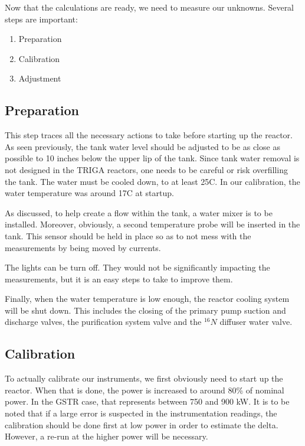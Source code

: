 Now that the calculations are ready, we need to measure our unknowns. Several steps are important:

\begin{enumerate}
\item Preparation
\item Calibration
\item Adjustment
\end{enumerate}

\subsection{Preparation}

This step traces all the necessary actions to take before starting up the reactor. As seen previously, the tank water level should be adjusted to be as close as possible to 10 inches below the upper lip of the tank. Since tank water removal is not designed in the TRIGA reactors, one needs to be careful or risk overfilling the tank. The water must be cooled down, to at least 25\degree C. In our calibration, the water temperature was around 17\degree C at startup.

As discussed, to help create a flow within the tank, a water mixer is to be installed. Moreover, obviously, a second temperature probe will be inserted in the tank. This sensor should be held in place so as to not mess with the measurements by being moved by currents.

The lights can be turn off. They would not be significantly impacting the measurements, but it is an easy steps to take to improve them.

Finally, when the water temperature is low enough, the reactor cooling system will be shut down. This includes the closing of the primary pump suction and discharge valves, the purification system valve and the ${}^{16}N$ diffuser water valve.


\subsection{Calibration}

To actually calibrate our instruments, we first obviously need to start up the reactor. When that is done, the power is increased to around 80\% of nominal power. In the GSTR case, that represents between 750 and 900 kW. It is to be noted that if a large error is suspected in the instrumentation readings, the calibration should be done first at low power in order to estimate the delta. However, a re-run at the higher power will be necessary.

